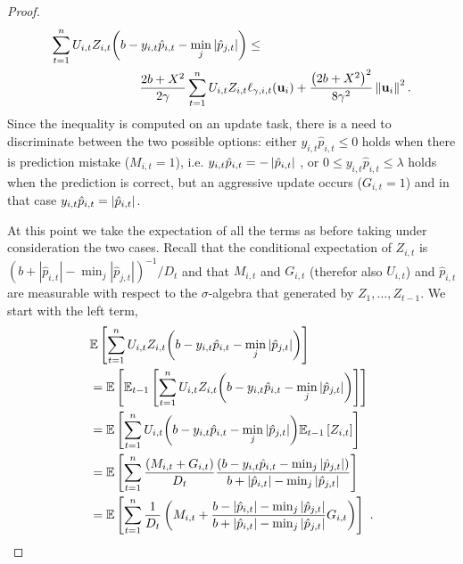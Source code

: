 {\begin{proof}
\begin{equation}
\begin{split}
\sum_{t=1}^{n}U_{i,t}Z_{i,t}{\left({b -y_{i,t}\hat{p}_{i,t}-\min_j{\left\vert{\hat{p}_{j,t}}\right\vert}}\right)}&\le\\
\frac{2b+X^2}{2\gamma}\sum_{t=1}^{n}U_{i,t}Z_{i,t}&\ell_{\gamma,i,t}(\mathbf{u}_i)+\frac{\left({2b+X^2}\right)^2}{8{\gamma}^2}\left\Vert {\mathbf{u}_i} \right\Vert^2.
\label{eq:step_3_in_proof_agressive}
\end{split}
\end{equation}
 Since the inequality is computed on an update task, there is a need to discriminate between   the two possible options: either 
$y_{i,t}\hat{p}_{i,t}\le0$ holds  when there is prediction mistake ($M_{i,t}=1$), i.e. $y_{i,t}\hat{p}_{i,t}=-\left\vert{\hat{p}_{i,t}}\right\vert$  ,  or $0\le y_{i,t}\hat{p}_{i,t}\le\lambda$ holds  when the prediction is correct,  but an aggressive update occurs ($G_{i,t}=1$) and  in that case  $y_{i,t}\hat{p}_{i,t}=\left\vert{\hat{p}_{i,t}}\right\vert$.

At this point we take  the expectation of all the terms as before taking under consideration the two cases.  Recall that the conditional expectation of $Z_{i,t}$ is
$(b+|\hat{p}_{i,t}|-\min_j| \hat{p}_{j,t}|)^{-1}/D_{t}$
and that $M_{i,t}$ and $G_{i,t}$ (therefor also $U_{i,t}$) and $\hat{p}_{i,t}$ are measurable with respect to the $\sigma$-algebra that generated by $Z_1,\ldots,Z_{t-1}$. 
We start with the left term,
\begin{align}
\begin{split}
&\mathbb{E}\left[{\sum_{t=1}^{n}U_{i,t}Z_{i,t}{\left({b-y_{i,t}\hat{p}_{i,t}-\min_{j}{\left\vert{ \hat{p}_{j,t}}\right\vert}}\right)}}\right]\\
&=\mathbb{E}\left[{\mathbb{E}_{t-1}\left[{{\sum_{t=1}^{n}{U_{i,t}Z_{i,t}{\left(b-y_{i,t}\hat{p}_{i,t}-\min_{j}{\left\vert{\hat{p}_{j,t}}\right\vert}\right)}}}}\right]}\right] \\
&=\mathbb{E}\left[{{\sum_{t=1}^{n}U_{i,t}{\left({b -y_{i,t}\hat{p}_{i,t}}-\min_{j}{\left\vert \hat{p}_{j,t} \right\vert}\right)}\mathbb{E}_{t-1}\left[{ Z_{i,t}}\right]}}\right]\\
&=\mathbb{E}\left[{\sum_{t=1}^{n}\frac{\left({M_{i,t}+G_{i,t}}\right)}{D_{t}}\frac{\left({b -y_{i,t}\hat{p}_{i,t}-\min_{j}\left\vert{\hat{p}_{j,t}}\right\vert}\right)}{b+\left\vert{\hat{p}_{i,t}}\right\vert-\min_{j}{\left\vert{\hat{p}_{j,t}}\right\vert}}}\right]\\
&=\mathbb{E}\left[{\sum_{t=1}^{n}{\frac{1}{D_{t}}\left({M_{i,t}+\frac{b-\left\vert{\hat{p}_{i,t}}\right\vert-\min_{j}{\left\vert{\hat{p}_{j,t}}\right\vert }}{b+\left\vert{\hat{p}_{i,t}}\right\vert-\min_{j}{\left\vert{\hat{p}_{j,t}}\right\vert}}G_{i,t} }\right)}}\right]~.
\label{eq:FO_cond_exp}
\end{split}
\end{align}


\end{proof}}

